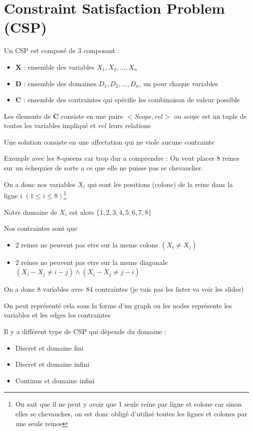 \section{Constraint Satisfaction Problem (CSP)}

	Un CSP est composé de 3 composant : 
	\begin{itemize}
		\item \textbf{X} : ensemble des variables $X_1,X_2,...,X_n$
		\item \textbf{D} : ensemble des domaines $D_1,D_2,...,D_n$, un pour chaque variables
		\item \textbf{C} : ensemble des contraintes qui spécifie les combinaison de valeur possible
	\end{itemize}
	
	Les élements de \textbf{C} consiste en une paire $<Scope, rel>$ ou $scope$ est un tuple de toutes les variables impliqué et $rel$ leurs relations
	
	Une solution consiste en une affectation qui ne viole aucune contrainte
	
	Exemple avec les 8-queens car trop dur a comprendre :
		On veut placer 8 reines sur un échequier de sorte a ce que elle ne puisse pas se chevaucher.
		
		On a donc nos variables $X_i$ qui sont les positions (colone) de la reine dans la ligne i $(1 \leq i \leq 8)$\footnote{On sait que il ne peut y avoir que 1 seule reine par ligne et colone car sinon elles se chevauches, on est donc obligé d'utilisé toutes les lignes et colones par une seule reines}
		
		Notre domaine de $X_i$ est alors $\{1,2,3,4,5,6,7,8\}$
		
		Nos contraintes sont que
		\begin{itemize}
			\item 2 reines ne peuvent pas etre sur la meme colone $(X_i \neq X_j)$
			\item 2 reines ne peuvent pas etre sur la meme diagonale $(X_i - X_j \neq i-j) \wedge (X_i - X_j \neq j-i) $
		\end{itemize}
		
		On a donc 8 variables avec 84 contraintes (je vais pas les lister va voir les slides)
		
		
	
	On peut représenté  cela sous la forme d'un graph ou les nodes représente les variables et les edges les contraintes
	
	Il y a différent type de CSP qui dépende du domaine :
	\begin{itemize}
		\item Discret et domaine fini
		\item Discret et domaine infini
		\item Continus et domaine infini
	\end{itemize}
	
